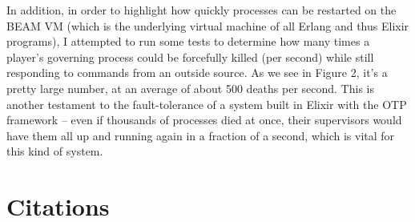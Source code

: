 \documentclass[letterpaper]{article}
\begin{document}
	In addition, in order to highlight how quickly processes can be restarted on the BEAM VM (which is the underlying virtual machine of all Erlang and thus Elixir programs), I attempted to run some tests to determine how many times a player's governing process could be forcefully killed (per second) while still responding to commands from an outside source. As we see in Figure 2, it's a pretty large number, at an average of about 500 deaths per second. This is another testament to the fault-tolerance of a system built in Elixir with the OTP framework -- even if thousands of processes died at once, their supervisors would have them all up and running again in a fraction of a second, which is vital for this kind of system.

	\section{Citations}
\end{document}
